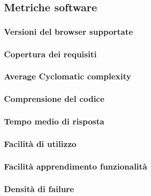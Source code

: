 \subsection{Metriche software}
\subsubsection{Versioni del browser supportate}
\subsubsection{Copertura dei requisiti}
\subsubsection{Average Cyclomatic complexity}
\subsubsection{Comprensione del codice}
\subsubsection{Tempo medio di risposta}
\subsubsection{Facilità di utilizzo}
\subsubsection{Facilità apprendimento funzionalità}
\subsubsection{Densità di failure}